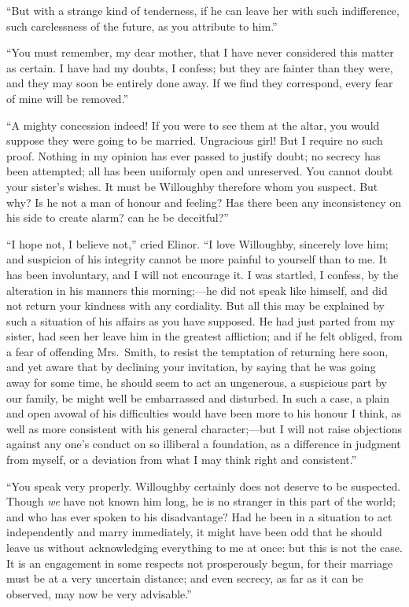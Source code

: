 \documentclass{article}
\begin{document}
``But with a strange kind of tenderness, if he can
leave her with such indifference, such carelessness
of the future, as you attribute to him.''

``You must remember, my dear mother, that I have never
considered this matter as certain.  I have had my doubts,
I confess; but they are fainter than they were, and they
may soon be entirely done away.  If we find they correspond,
every fear of mine will be removed.''

``A mighty concession indeed!  If you were to see
them at the altar, you would suppose they were going to
be married.  Ungracious girl!  But I require no such proof.
Nothing in my opinion has ever passed to justify doubt;
no secrecy has been attempted; all has been uniformly open
and unreserved.  You cannot doubt your sister's wishes.
It must be Willoughby therefore whom you suspect.  But why?
Is he not a man of honour and feeling? Has there been any
inconsistency on his side to create alarm? can he be deceitful?''

``I hope not, I believe not,'' cried Elinor.
``I love Willoughby, sincerely love him; and suspicion of his
integrity cannot be more painful to yourself than to me.
It has been involuntary, and I will not encourage it.
I was startled, I confess, by the alteration in his
manners this morning;---he did not speak like himself,
and did not return your kindness with any cordiality.
But all this may be explained by such a situation of his
affairs as you have supposed.  He had just parted from
my sister, had seen her leave him in the greatest affliction;
and if he felt obliged, from a fear of offending Mrs.\ Smith,
to resist the temptation of returning here soon, and yet
aware that by declining your invitation, by saying
that he was going away for some time, he should seem
to act an ungenerous, a suspicious part by our family,
be might well be embarrassed and disturbed.  In such a case,
a plain and open avowal of his difficulties would have been
more to his honour I think, as well as more consistent
with his general character;---but I will not raise objections
against any one's conduct on so illiberal a foundation,
as a difference in judgment from myself, or a deviation from
what I may think right and consistent.''

``You speak very properly.  Willoughby certainly does
not deserve to be suspected.  Though \emph{we} have not known
him long, he is no stranger in this part of the world;
and who has ever spoken to his disadvantage?  Had he been
in a situation to act independently and marry immediately,
it might have been odd that he should leave us without
acknowledging everything to me at once: but this is not the case.
It is an engagement in some respects not prosperously begun,
for their marriage must be at a very uncertain distance;
and even secrecy, as far as it can be observed, may now
be very advisable.''
\end{document}
